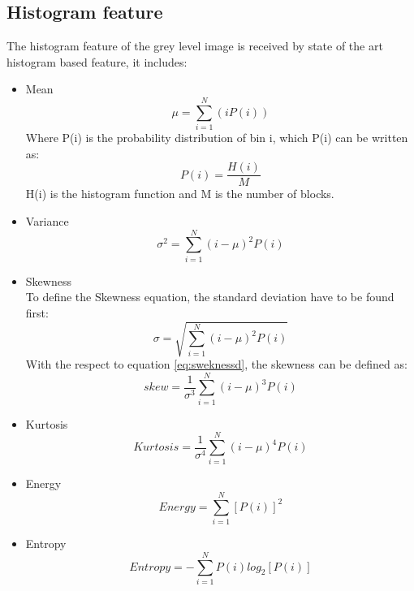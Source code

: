 \documentclass[review]{elsarticle}
\begin{document}
\subsection{Histogram feature}
\label{subsec:histogram}
The histogram feature of the grey level image is received by state of the art histogram based feature, it includes:

\begin{itemize}
	\item Mean
	\begin{equation}
	\mu= \sum_{i=1}^N (iP(i))
	\end{equation}
	Where	P(i) is the probability distribution of bin i, which P(i) can be written as: 
	\begin{equation}
	P(i) =\dfrac{H(i)}{M}
	\end{equation}
	\hspace{1cm}H(i) is the histogram function and M is the number of blocks.
	
	
	\item Variance
	\begin{equation}
	\sigma^2= \sum_{i=1}^N (i - \mu)^2P(i)
	\end{equation}
	
	
	\item Skewness \\
	To define the Skewness equation, the standard deviation have to be found first: 
	\begin{equation}
	\sigma = \sqrt{ \sum_{i=1}^N (i - \mu)^2 P(i)}
	\label{eq:sweknessd}
	\end{equation}
	With the respect to equation \ref{eq:sweknessd}, the skewness can be defined as: 
	\begin{equation}
	skew = \dfrac{1}{\sigma^3} \sum_{i=1}^N (i - \mu)^3 P(i)
	\end{equation}
	
	\item Kurtosis 
	\begin{equation}
	Kurtosis = \dfrac{1}{\sigma^4} \sum_{i=1}^N (i - \mu)^4 P(i)
	\end{equation}
	
	\item Energy 
	\begin{equation}
	Energy= \sum_{i=1}^N [P(i)]^2
	\end{equation}
	
	
	\item Entropy 
	\begin{equation}
	Entropy= - \sum_{i=1}^N P(i) log_2 [P(i)]
	\end{equation}
\end{itemize}
\end{document}
